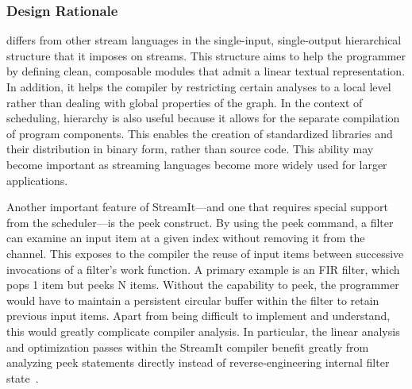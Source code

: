 \documentclass{sig-alt-full}
\begin{document}
\subsubsection{Design Rationale}

{\StreamIt} differs from other stream languages in the single-input,
single-output hierarchical structure that it imposes on streams.  This
structure aims to help the programmer by defining clean, composable
modules that admit a linear textual representation.  In addition, it
helps the compiler by restricting certain analyses to a local level
rather than dealing with global properties of the graph.  In the
context of scheduling, hierarchy is also useful because it allows for
the separate compilation of program components.  This enables the
creation of standardized libraries and their distribution in binary
form, rather than source code.  This ability may become important as
streaming languages become more widely used for larger applications.

Another important feature of StreamIt---and one that requires special
support from the scheduler---is the peek construct.  By using the peek
command, a filter can examine an input item at a given index without
removing it from the channel.  This exposes to the compiler the reuse
of input items between successive invocations of a filter's work
function.  A primary example is an FIR filter, which pops 1 item but
peeks N items.  Without the capability to peek, the programmer would
have to maintain a persistent circular buffer within the filter to
retain previous input items.  Apart from being difficult to implement
and understand, this would greatly complicate compiler analysis.  In
particular, the linear analysis and optimization passes within the
StreamIt compiler benefit greatly from analyzing peek statements
directly instead of reverse-engineering internal filter
state~\cite{lamb03}.
\end{document}
